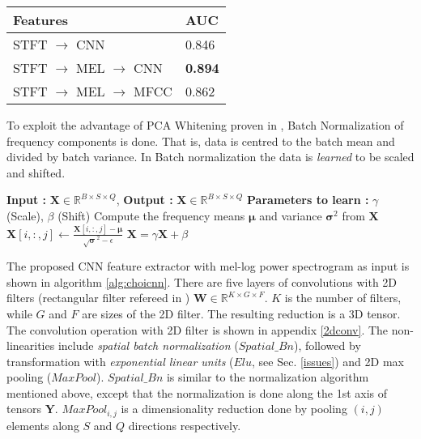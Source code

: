     \begin{tabular}{ | p{5cm} | l |}
    \hline
    \textbf{Features} & \textbf{AUC} \\ \hline
    STFT $\rightarrow$ CNN &  0.846\\ \hline
    STFT $\rightarrow$ MEL $\rightarrow$ CNN &  \textbf{0.894}\\ \hline
    STFT $\rightarrow$ MEL $\rightarrow$ MFCC &  0.862 \\ \hline
    \hline
    \end{tabular}
    
\noindent To exploit the advantage of PCA Whitening proven in \cite{MultiScale}\cite{featurelearn1}, Batch Normalization of frequency components is done. That is, data is centred to the batch mean and divided by batch variance. In Batch normalization the data is \textit{learned} to be scaled and shifted.
\begin{algorithm}
  \caption{$\textbf{\^{X}}$ = $BatchNorm$($\textbf{X}$) }\label{Batch norm}
  \begin{algorithmic}[1]
    \Statex \textbf{Input :} $\textbf{X} \in \mathbb{R}^{B \times S \times Q}$, 
    \Statex \textbf{Output :} $\textbf{\^X} \in \mathbb{R}^{B \times S \times Q}$ 
    \Statex \textbf{Parameters to learn :} $\gamma$ (Scale), $\beta$ (Shift) 
    \State Compute the frequency means $\bm{\mu}$ and variance $\bm{\sigma}^{2}$ from $\textbf{X}$ 
       \State $\textbf{X}[i,:,j] \leftarrow \frac{\textbf{X}[i,:,j] - \bm{\mu}}{\sqrt{\bm{\sigma}}^{2} - \epsilon}$
      \EndFor
     \EndFor
     \State $\textbf{\^X} = \gamma\textbf{X} + \beta$
  \end{algorithmic}
\end{algorithm}
\FloatBarrier

\noindent The proposed CNN feature extractor with mel-log power spectrogram as input is shown in algorithm \ref{alg:choicnn}. There are five layers of convolutions with 2D filters (rectangular filter refereed in \cite{MusicMotive}) $\textbf{W} \in \mathbb{R}^{K \times G \times F}$. $K$ is the number of filters, while $G$ and $F$ are sizes of the 2D filter. The resulting reduction is a 3D tensor. The convolution operation with 2D filter is shown in appendix \ref{2dconv}. The non-linearities include \textit{spatial batch normalization} ($Spatial\_Bn$), followed by transformation with \textit{exponential linear units} ($Elu$, see Sec. \ref{issues}) and 2D max pooling ($MaxPool$). $Spatial\_Bn$ is similar to the normalization algorithm mentioned above, except that the normalization is done along the 1st axis of tensors $\textbf{Y}$. $MaxPool_{i,j}$ is a dimensionality reduction done by pooling $(i,j)$ elements along $S$ and $Q$ directions respectively.  

